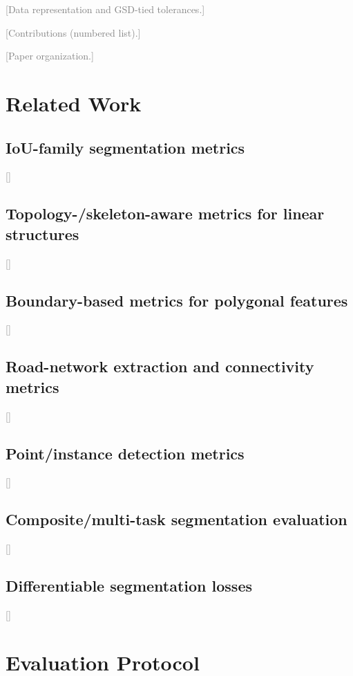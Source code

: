 \documentclass[sigconf]{acmart}
\newcommand{\tbd}[1]{\textcolor{gray}{[#1]}}
\begin{document}
\tbd{Data representation and GSD-tied tolerances.}

\tbd{Contributions (numbered list).}

\tbd{Paper organization.}

\section{Related Work}
\label{sec:related}

\subsection{IoU-family segmentation metrics}
\tbd{}

\subsection{Topology-/skeleton-aware metrics for linear structures}
\tbd{}

\subsection{Boundary-based metrics for polygonal features}
\tbd{}

\subsection{Road-network extraction and connectivity metrics}
\label{subsec:related-roads}
\tbd{}

\subsection{Point/instance detection metrics}
\tbd{}

\subsection{Composite/multi-task segmentation evaluation}
\tbd{}

\subsection{Differentiable segmentation losses}
\label{subsec:related-losses}
\tbd{}

\section{Evaluation Protocol}
\label{sec:evalprotocol}
\end{document}
